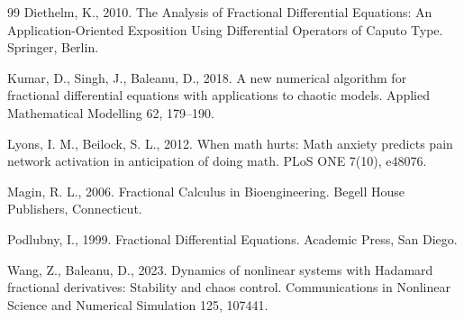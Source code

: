 \documentclass[10pt]{NSP1}
\begin{document}
\begin{thebibliography}{99}
Diethelm, K., 2010. The Analysis of Fractional Differential Equations: An Application-Oriented Exposition Using Differential Operators of Caputo Type. Springer, Berlin.

Kumar, D., Singh, J., Baleanu, D., 2018. A new numerical algorithm for fractional differential equations with applications to chaotic models. Applied Mathematical Modelling 62, 179–190.

Lyons, I. M., Beilock, S. L., 2012. When math hurts: Math anxiety predicts pain network activation in anticipation of doing math. PLoS ONE 7(10), e48076.

Magin, R. L., 2006. Fractional Calculus in Bioengineering. Begell House Publishers, Connecticut.

Podlubny, I., 1999. Fractional Differential Equations. Academic Press, San Diego.

Wang, Z., Baleanu, D., 2023. Dynamics of nonlinear systems with Hadamard fractional derivatives: Stability and chaos control. Communications in Nonlinear Science and Numerical Simulation 125, 107441.

\end{thebibliography}
\end{document}
